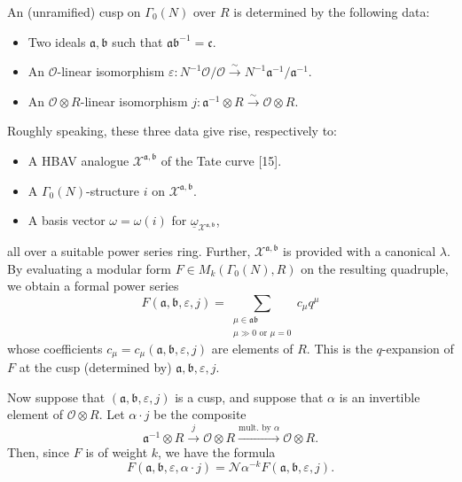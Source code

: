 \documentclass[12pt,a4paper]{article}
\theoremstyle{plain}
\theoremstyle{definition}
\theoremstyle{remark}
\begin{document}
An (unramified) cusp on $\Gamma_0(N)$ over $R$ is determined by the following data:
\begin{itemize}
\item Two ideals $\mathfrak{a}, \mathfrak{b}$ such that $\mathfrak{a}\mathfrak{b}^{-1} = \mathfrak{c}$.
\item An $\mathcal{O}$-linear isomorphism $\varepsilon: N^{-1}\mathcal{O}/\mathcal{O} \xrightarrow{\sim} N^{-1}\mathfrak{a}^{-1}/\mathfrak{a}^{-1}$.
\item An $\mathcal{O} \otimes R$-linear isomorphism $j: \mathfrak{a}^{-1} \otimes R \xrightarrow{\sim} \mathcal{O} \otimes R$.
\end{itemize}
Roughly speaking, these three data give rise, respectively to:
\begin{itemize}
\item A HBAV analogue $\mathcal{X}^{\mathfrak{a},\mathfrak{b}}$ of the Tate curve [15].
\item A $\Gamma_0(N)$-structure $i$ on $\mathcal{X}^{\mathfrak{a},\mathfrak{b}}$.
\item A basis vector $\omega = \omega(i)$ for $\underline{\omega}_{\mathcal{X}^{\mathfrak{a},\mathfrak{b}}}$,
\end{itemize}
all over a suitable power series ring. Further, $\mathcal{X}^{\mathfrak{a},\mathfrak{b}}$ is provided with a canonical $\lambda$. By evaluating a modular form $F \in M_k(\Gamma_0(N), R)$ on the resulting quadruple, we obtain a formal power series
\[
F(\mathfrak{a}, \mathfrak{b}, \varepsilon, j) = \sum_{\substack{\mu \in \mathfrak{a}\mathfrak{b} \\ \mu \gg 0 \text{ or } \mu = 0}} c_\mu q^\mu
\]
whose coefficients $c_\mu = c_\mu(\mathfrak{a}, \mathfrak{b}, \varepsilon, j)$ are elements of $R$. This is the $q$-expansion of $F$ at the cusp (determined by) $\mathfrak{a}, \mathfrak{b}, \varepsilon, j$.

Now suppose that $(\mathfrak{a}, \mathfrak{b}, \varepsilon, j)$ is a cusp, and suppose that $\alpha$ is an invertible element of $\mathcal{O} \otimes R$. Let $\alpha \cdot j$ be the composite
\[
\mathfrak{a}^{-1} \otimes R \xrightarrow{j} \mathcal{O} \otimes R \xrightarrow{\text{mult. by } \alpha} \mathcal{O} \otimes R.
\]
Then, since $F$ is of weight $k$, we have the formula
\begin{equation}\label{eq:5.2}
F(\mathfrak{a}, \mathfrak{b}, \varepsilon, \alpha \cdot j) = \mathcal{N}\alpha^{-k} F(\mathfrak{a}, \mathfrak{b}, \varepsilon, j).
\end{equation}
\end{document}
